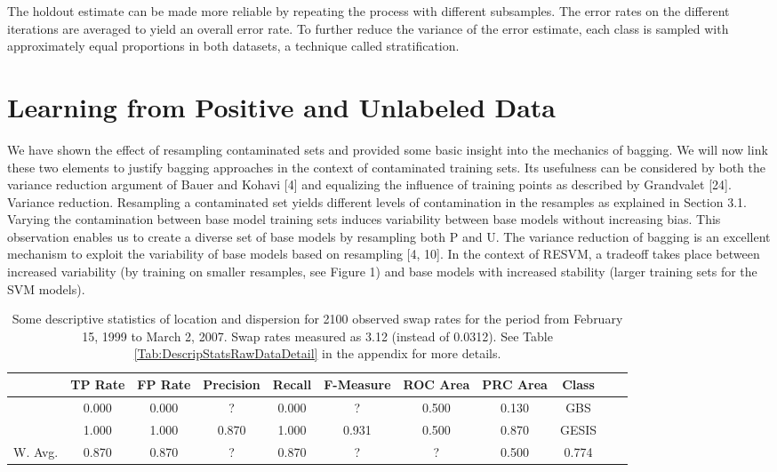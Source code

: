 The holdout estimate can be made more reliable by repeating the process with different subsamples. The error rates on the different iterations are averaged to yield an overall error rate. To further reduce the variance of the error estimate, each class is sampled with approximately equal proportions in both datasets, a technique called stratiﬁcation.

\section{Learning from Positive and Unlabeled Data}

We have shown the eﬀect of resampling contaminated sets and provided some basic insight into the mechanics of bagging. We will now link these two elements to justify bagging approaches in the context of contaminated training sets. Its usefulness can be considered by both the variance reduction argument of Bauer and Kohavi [4] and equalizing the inﬂuence of training points as described by Grandvalet [24]. Variance reduction. Resampling a contaminated set yields diﬀerent levels of contamination in the resamples as explained in Section 3.1. Varying the contamination between base model training sets induces variability between base models without increasing bias. This observation enables us to create a diverse set of base models by resampling both P and U. The variance reduction of bagging is an excellent mechanism to exploit the variability of base models based on resampling [4, 10]. In the context of RESVM, a tradeoﬀ takes place between increased variability (by training on smaller resamples, see Figure 1) and base models with increased stability (larger training sets for the SVM models).

\vspace{0.333cm}
\begin{table}[ht] 	
    \begin{center}
            {\footnotesize
            \begin{tabular}{l|cccccccccc}
                \hline \hline
                           &  TP Rate & FP Rate & Precision & Recall & F-Measure & ROC Area & PRC Area & Class \\
                \hline
                      & 0.000 & 0.000 & ? & 0.000 & ? & 0.500 & 0.130 & GBS &\\
                      & 1.000 & 1.000 & 0.870 & 1.000 & 0.931 & 0.500 & 0.870 & GESIS &\\
                \hline \hline
		 W. Avg. & 0.870 & 0.870 & ? & 0.870 & ? & ? & 0.500 & 0.774 &
            \end{tabular}}
        \caption{Some descriptive statistics of location and dispersion for 2100 observed swap rates for the period from February 15, 1999 to March 2, 2007. Swap rates measured as 3.12 (instead of 0.0312). See Table \ref{Tab:DescripStatsRawDataDetail} in the appendix for more details.}
\label{Tab:DescripStatsRawData}
\end{center}
\end{table}

